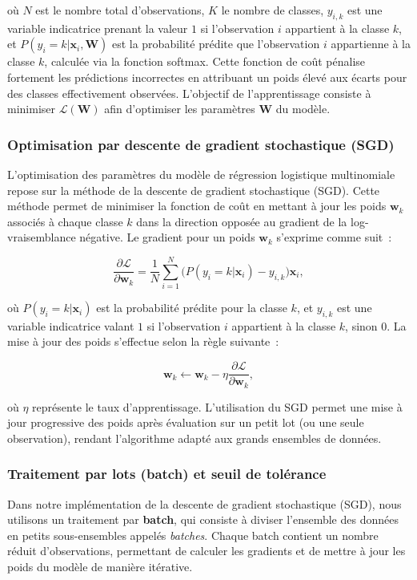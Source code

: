 \documentclass{rapport}
\begin{document}
où $N$ est le nombre total d'observations, $K$ le nombre de classes, $y_{i,k}$ est une variable indicatrice prenant la valeur $1$ si l'observation $i$ appartient à la classe $k$, et $P(y_i = k | \mathbf{x}_i, \mathbf{W})$ est la probabilité prédite que l'observation $i$ appartienne à la classe $k$, calculée via la fonction softmax. Cette fonction de coût pénalise fortement les prédictions incorrectes en attribuant un poids élevé aux écarts pour des classes effectivement observées. L’objectif de l’apprentissage consiste à minimiser $\mathcal{L}(\mathbf{W})$ afin d’optimiser les paramètres $\mathbf{W}$ du modèle.


\subsubsection{Optimisation par descente de gradient stochastique (SGD)}

L’optimisation des paramètres du modèle de régression logistique multinomiale repose sur la méthode de la descente de gradient stochastique (SGD). Cette méthode permet de minimiser la fonction de coût en mettant à jour les poids $\mathbf{w}_k$ associés à chaque classe $k$ dans la direction opposée au gradient de la log-vraisemblance négative. Le gradient pour un poids $\mathbf{w}_k$ s’exprime comme suit :

\[
\frac{\partial \mathcal{L}}{\partial \mathbf{w}_k} = \frac{1}{N} \sum_{i=1}^N \big( P(y_i = k | \mathbf{x}_i) - y_{i,k} \big) \mathbf{x}_i,
\]

où $P(y_i = k | \mathbf{x}_i)$ est la probabilité prédite pour la classe $k$, et $y_{i,k}$ est une variable indicatrice valant $1$ si l'observation $i$ appartient à la classe $k$, sinon $0$. La mise à jour des poids s'effectue selon la règle suivante :

\[
\mathbf{w}_k \leftarrow \mathbf{w}_k - \eta \frac{\partial \mathcal{L}}{\partial \mathbf{w}_k},
\]

où $\eta$ représente le taux d’apprentissage. L’utilisation du SGD permet une mise à jour progressive des poids après évaluation sur un petit lot (ou une seule observation), rendant l’algorithme adapté aux grands ensembles de données.


\subsubsection{Traitement par lots (batch) et seuil de tolérance}

Dans notre implémentation de la descente de gradient stochastique (SGD), nous utilisons un traitement par \textbf{batch}, qui consiste à diviser l'ensemble des données en petits sous-ensembles appelés \emph{batches}. Chaque batch contient un nombre réduit d'observations, permettant de calculer les gradients et de mettre à jour les poids du modèle de manière itérative. 
\end{document}
